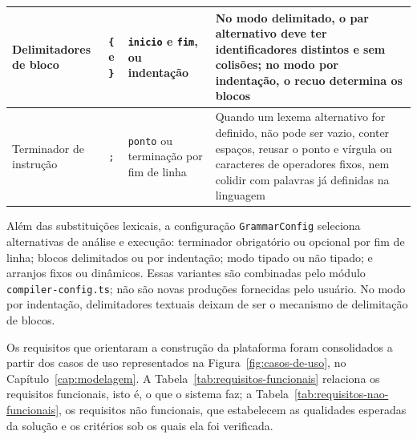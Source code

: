 \begin{table}[htbp]
\begin{tabular}{|>{\raggedright\arraybackslash}p{2.5cm}|>{\raggedright\arraybackslash}p{2.6cm}|>{\raggedright\arraybackslash}p{2.9cm}|>{\raggedright\arraybackslash}p{5.2cm}|}
        \hline
        Delimitadores de bloco & \texttt{\{} e \texttt{\}} & \texttt{inicio} e \texttt{fim}, ou indentação & No modo delimitado, o par alternativo deve ter identificadores distintos e sem colisões; no modo por indentação, o recuo determina os blocos \\
        \hline
        Terminador de instrução & \texttt{;} & \texttt{ponto} ou terminação por fim de linha & Quando um lexema alternativo for definido, não pode ser vazio, conter espaços, reusar o ponto e vírgula ou caracteres de operadores fixos, nem colidir com palavras já definidas na linguagem \\
        \hline
    \end{tabular}
\end{table}

Além das substituições lexicais, a configuração \texttt{GrammarConfig} seleciona alternativas de análise e execução: terminador obrigatório ou opcional por fim de linha; blocos delimitados ou por indentação; modo tipado ou não tipado; e arranjos fixos ou dinâmicos. Essas variantes são combinadas pelo módulo \texttt{compiler-config.ts}; não são novas produções fornecidas pelo usuário. No modo por indentação, delimitadores textuais deixam de ser o mecanismo de delimitação de blocos.

Os requisitos que orientaram a construção da plataforma foram consolidados a partir dos casos de uso representados na Figura~\ref{fig:casos-de-uso}, no Capítulo~\ref{cap:modelagem}. A Tabela~\ref{tab:requisitos-funcionais} relaciona os requisitos funcionais, isto é, o que o sistema faz; a Tabela~\ref{tab:requisitos-nao-funcionais}, os requisitos não funcionais, que estabelecem as qualidades esperadas da solução e os critérios sob os quais ela foi verificada.

